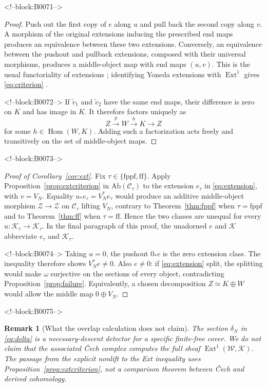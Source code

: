 \documentclass[11pt]{article}
\newtheorem{remark}[theorem]{Remark}
\theoremstyle{definition}
\newcommand{\Ext}{\operatorname{Ext}}
\newcommand{\Hom}{\operatorname{Hom}}
\newcommand{\Zsh}{\mathcal Z}
\newcommand{\Wsh}{\mathcal W}
\newcommand{\Ksh}{\mathcal K}
\newcommand{\ff}{\mathrm{ff}}
\newcommand{\fppf}{\mathrm{fppf}}
\begin{document}
<!--block:B0071-->
\begin{proof}
Push out the first copy of \(e\) along \(u\) and pull back the second copy
along \(v\).  A morphism of the original extensions inducing the prescribed
end maps produces an equivalence between these two extensions.  Conversely,
an equivalence between the pushout and pullback extensions, composed with
their universal morphisms, produces a middle-object map with end maps
\((u,v)\).  This is the usual functoriality of extensions
\cite[Tag 010I]{StacksProject}; identifying Yoneda extensions with
\(\Ext^1\) gives \eqref{eq:criterion}
\cite[Tag 06XP]{StacksProject}.

<!--block:B0072-->
If \(\widetilde v_1\) and \(\widetilde v_2\) have the same end maps, their
difference is zero on \(K\) and has image in \(K\).  It therefore factors
uniquely as
\[
 Z\xrightarrow{p}W\xrightarrow{h}K\longrightarrow Z
\]
for some \(h\in\Hom(W,K)\).  Adding such a factorization acts freely and
transitively on the set of middle-object maps.
\end{proof}

<!--block:B0073-->
\begin{proof}[Proof of Corollary~\ref{cor:ext}]
Fix \(\tau\in\{\fppf,\ff\}\).  Apply
Proposition~\ref{prop:extcriterion} in
\(\mathrm{Ab}(\mathscr C_\tau)\) to the extension \(e_\tau\) in
\eqref{eq:extension}, with \(v=V_N\).  Equality
\(u_*e_\tau=V_N^*e_\tau\) would produce an additive middle-object
morphism \(\Zsh\to\Zsh\) on \(\mathscr C_\tau\) lifting \(V_N\), contrary
to Theorem~\ref{thm:fppf} when \(\tau=\fppf\) and to
Theorem~\ref{thm:ff} when \(\tau=\ff\).  Hence the two classes are unequal
for every \(u\colon\Ksh_\tau\to\Ksh_\tau\).  In the final paragraph of
this proof, the unadorned \(e\) and \(\Ksh\) abbreviate \(e_\tau\) and
\(\Ksh_\tau\).

<!--block:B0074-->
Taking \(u=0\), the pushout \(0_*e\) is the zero extension class.  The
inequality therefore shows \(V_N^*e\ne0\).  Also \(e\ne0\): if
\eqref{eq:extension} split, the splitting would make \(\omega\) surjective
on the sections of every object, contradicting
Proposition~\ref{prop:failure}.  Equivalently, a chosen decomposition
\(Z\simeq K\oplus W\) would allow the middle map \(0\oplus V_N\).
\end{proof}

<!--block:B0075-->
\begin{remark}[What the overlap calculation does not claim]
The section \(\delta_N\) in \eqref{eq:delta} is a necessary-descent
detector for a specific finite-free cover.  We do not claim that the
associated \v Cech complex computes the full sheaf
\(\Ext^1(\Wsh,\Ksh)\).  The passage from the explicit nonlift to the Ext
inequality uses Proposition~\ref{prop:extcriterion}, not a comparison
theorem between \v Cech and derived cohomology.
\end{remark}
\end{document}
